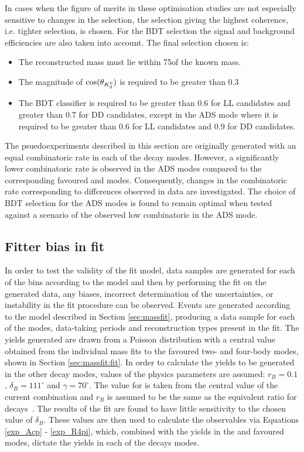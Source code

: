 In cases when the figure of merits in these optimisation studies are not especially sensitive to changes in the selection, the selection giving the highest coherence, i.e. tighter \Kstarm selection, is chosen. For the BDT selection the signal and background efficiencies are also taken into account. The final selection chosen is:

\begin{itemize}
\item{The reconstructed \Kstarm mass must lie within 75\mev of the known \Kstarm mass.}
\item{The magnitude of $\cos(\theta_{{{K}^0_{\mathrm{ \scriptscriptstyle S}}}})$ is required to be greater than 0.3}
\item{The BDT classifier is required to be greater than 0.6 for LL candidates and greater than 0.7 for DD candidates, except in the ADS mode where it is required to be greater than 0.6 for LL candidates and 0.9 for DD candidates.}
\end{itemize}

The psuedoexperiments described in this section are originally generated with an equal combinatoric rate in each of the \Dz decay modes. However, a significantly lower combinatoric rate is observed in the ADS modes compared to the corresponding favoured \kpi and \kpipipi modes. Consequently, changes in the combinatoric rate corresponding to differences observed in data are investigated. The choice of BDT selection for the ADS modes is found to remain optimal when tested against a scenario of the observed low combinatoric in the ADS mode. 

\subsection{Fitter bias in \CP fit}
\label{sec:cpfit:fitterbias}

In order to test the validity of the \CP fit model, data samples are generated for each of the bins according to the model and then by performing the \CP fit on the generated data, any biases, incorrect determination of the uncertainties, or instability in the \CP fit procedure can be observed. Events are generated according to the model described in Section \ref{sec:massfit}, producing a data sample for each of the \Dz modes, data-taking periods and \KS reconstruction types present in the \CP fit. The yields generated are drawn from a Poisson distribution with a central value obtained from the individual mass fits to the favoured two- and four-body modes, shown in Section \ref{sec:massfit:fit}. In order to calculate the yields to be generated in the other \Dz decay modes, values of the physics parameters are assumed: $r_B = 0.1$, $\delta_B = 111^{\circ}$ and $\gamma = 70^{\circ}$. The value for \Pgamma is taken from the central value of the current \lhcb combination and $r_B$ is assumed to be the same as the equivalent ratio for \decay{\Bm}{\D\Km} decays~\cite{LHCb-PAPER-2016-032}. The results of the fit are found to have little sensitivity to the chosen value of $\delta_B$. These values are then used to calculate the \CP observables via Equations \ref{exp_Acp} - \ref{exp_R4pi}, which, combined with the yields in the \kpi and \kpipipi favoured modes, dictate the yields in each of the \Dz decays modes. 

